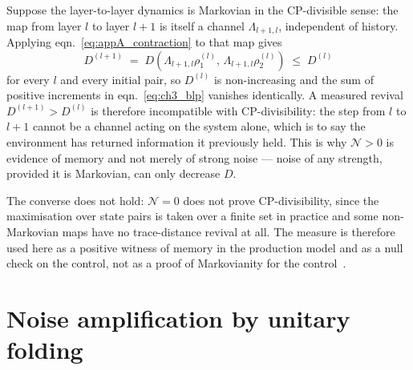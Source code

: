 Suppose the layer-to-layer dynamics is Markovian in the CP-divisible sense: the map
from layer $l$ to layer $l+1$ is itself a channel $\Lambda_{l+1,l}$, independent of
history. Applying eqn.~\eqref{eq:appA_contraction} to that map gives
\begin{equation}
    D^{(l+1)} \;=\; D\!\left( \Lambda_{l+1,l}\rho_1^{(l)},\,
    \Lambda_{l+1,l}\rho_2^{(l)} \right) \;\leq\; D^{(l)}
    \label{eq:appA_monotone}
\end{equation}
for every $l$ and every initial pair, so $D^{(l)}$ is non-increasing and the sum of
positive increments in eqn.~\eqref{eq:ch3_blp} vanishes identically. A measured
revival $D^{(l+1)} > D^{(l)}$ is therefore incompatible with CP-divisibility: the
step from $l$ to $l+1$ cannot be a channel acting on the system alone, which is to
say the environment has returned information it previously held. This is why
$\mathcal{N} > 0$ is evidence of memory and not merely of strong noise --- noise of
any strength, provided it is Markovian, can only decrease $D$.

The converse does not hold: $\mathcal{N} = 0$ does not prove CP-divisibility, since
the maximisation over state pairs is taken over a finite set in practice and some
non-Markovian maps have no trace-distance revival at all. The measure is therefore
used here as a positive witness of memory in the production model and as a null
check on the control, not as a proof of Markovianity for the
control~\cite{rivas2014nonmarkov}.

\section{Noise amplification by unitary folding}
\label{sec:appA_folding}

